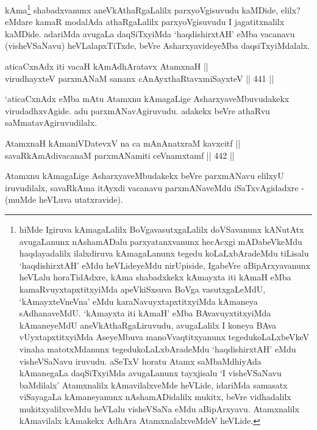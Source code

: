 \begin{artha}
kAma\footnote{hiMde Igiruva kAmagaLalilx BoVgavasutxgaLalilx
doVSavanunx kANutAtx avugaLanunx nAshamADalu parxyatanxvanunx
hecAcxgi mADabeVkeMdu haqdayadalilx ilalxdiruva kAmagaLanunx tegedu
koLaLxbAradeMdu tiLisalu `haqdishirxtAH' eMdu heVLideyeMdu
nirUpiside, IgabeVre aBipArxyavanunx heVLalu horaTidAdxre, kAma
shabadxkekx kAmayxta iti kAmaH eMba kamaRvuyxtapxtitxyiMda
apeVkiSxsuva BoVga vasutxgaLeMdU, `kAmayxteV\s neVna' eMdu
karaNavuyxtapxtitxyiMda kAmaneya sAdhanaveMdU. `kAmayxta iti kAmaH'
eMba BAvavuyxtitxyiMda kAmaneyeMdU aneVkAthaRgaLiruvudu, avugaLalilx
I koneya BAva vUyxtapxtitxyiMda AseyeMbuva manoVvaqtitxyanunx
tegedukoLaLxbeVkeV vinaha matotxMdanunx tegedukoLaLxbAradeMdu
`haqdishirxtAH' eMdu visheVSaNavu iruvudu. aSeTxV horatu Atamx
saMbaMdhiyAda kAmanegaLa daqSiTxyiMda avugaLanunx tayxjisalu `I
visheVSaNavu baMdilalx' Atamxnalilx kAmavilalxveMde heVLide,
idariMda samasatx viSayagaLa kAmaneyanunx nAshamADidalilx mukitx,
beVre vidhadalilx mukitxyalilxveMdu heVLalu visheVSaNa eMdu
aBipArxyavu. Atamxnalilx kAmavilalx kAmakekx AdhAra
AtamxnalalxveMdeV heVLide.} shabadxvanunx aneVkAthaRgaLalilx parxyoVgisuvudu
kaMDide, elilx? eMdare kamaR modalAda athaRgaLalilx parxyoVgisuvudu I
jagatitxnalilx kaMDide. adariMda avugaLa daqSiTxyiMda `haqdishirxtAH'
eMba vacanavu (visheVSaNavu) heVLalapxTiTxde, beVre AsharxyavideyeMba
daqsiTxyiMdalalx.
\end{artha}


\begin{shl}
aticaCxnAdx iti vacaH kAmAdhAratavx AtamxnaH || \\
virudhayxteV parxmANaM sananx cAnAyxthaRtavxmiSayxteV \hfill || 441 ||  
\end{shl}

\begin{artha}
`aticaCxnAdx eMba mAtu Atamxnu kAmagaLige AsharxyaveMbuvudakekx
virudadhxvAgide. adu parxmANavAgiruvudu. adakekx beVre athaRvu
saMmatavAgiruvudilalx.
\end{artha}

\begin{shl}
AtamxnaH kAmaniVDatevxV na ca mAnAnatxraM kavxcitf ||  \\
savaRkAmAdivacanaM parxmANamiti ceVnamxtamf \hfill || 442 ||  
\end{shl}

\begin{artha}
Atamxnu kAmagaLige AsharxyaveMbudakekx beVre parxmANavu elilxyU
iruvudilalx, savaRkAma itAyxdi vacanavu parxmANaveMdu iSaTxvAgidadxre
- (muMde heVLuva utatxravide).
\end{artha}

